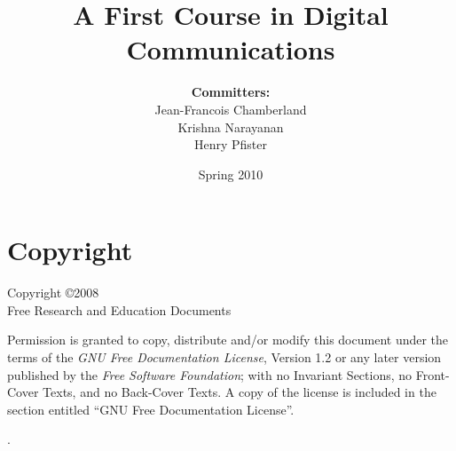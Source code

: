 \documentclass[12pt,openany]{book}
\begin{document}
\frontmatter

\author{
\textbf{Committers:} \\
Jean-Francois Chamberland \\
Krishna Narayanan \\
Henry Pfister}

\title{A First Course in Digital Communications}

\date{Spring 2010}

\maketitle

\chapter*{Copyright}
Copyright \copyright 2008 \\
Free Research and Education Documents

Permission is granted to copy, distribute and/or modify this document under the terms of the \emph{GNU Free Documentation License}, Version 1.2 or any later version published by the \emph{Free Software Foundation}; with no Invariant Sections, no Front-Cover Texts, and no Back-Cover Texts.
A copy of the license is included in the section entitled ``GNU Free Documentation License''.

\tableofcontents



.

\mainmatter







%
%

\appendix

%

%

\backmatter

\printindex
\end{document}

